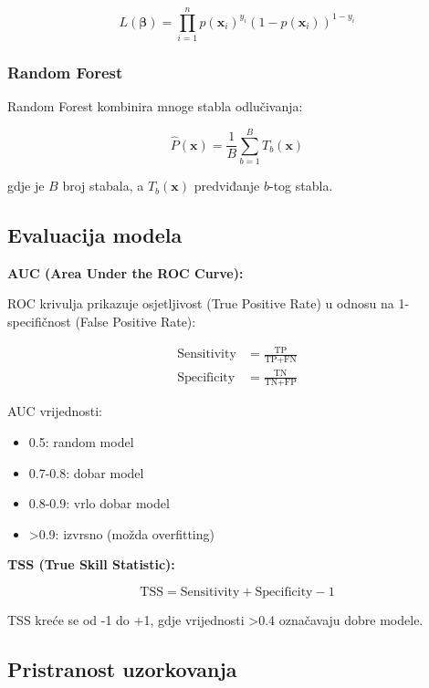 \documentclass[11pt,oneside]{book}
\begin{document}
\begin{equation}
	L(\boldsymbol{\beta}) = \prod_{i=1}^n p(\mathbf{x}_i)^{y_i} (1-p(\mathbf{x}_i))^{1-y_i}
\end{equation}

\subsubsection{Random Forest}

Random Forest kombinira mnoge stabla odlučivanja:

\begin{equation}
	\hat{P}(\mathbf{x}) = \frac{1}{B} \sum_{b=1}^B T_b(\mathbf{x})
\end{equation}

gdje je $B$ broj stabala, a $T_b(\mathbf{x})$ predviđanje $b$-tog stabla.

\subsection{Evaluacija modela}

\textbf{AUC (Area Under the ROC Curve):}

ROC krivulja prikazuje osjetljivost (True Positive Rate) u odnosu na 1-specifičnost (False Positive Rate):

\begin{align}
	\text{Sensitivity} &= \frac{\text{TP}}{\text{TP} + \text{FN}} \\
	\text{Specificity} &= \frac{\text{TN}}{\text{TN} + \text{FP}}
\end{align}

AUC vrijednosti:
\begin{itemize}
	\item 0.5: random model
	\item 0.7-0.8: dobar model
	\item 0.8-0.9: vrlo dobar model
	\item >0.9: izvrsno (možda overfitting)
\end{itemize}

\textbf{TSS (True Skill Statistic):}

\begin{equation}
	\text{TSS} = \text{Sensitivity} + \text{Specificity} - 1
\end{equation}

TSS kreće se od -1 do +1, gdje vrijednosti >0.4 označavaju dobre modele.

\subsection{Pristranost uzorkovanja}
\end{document}
